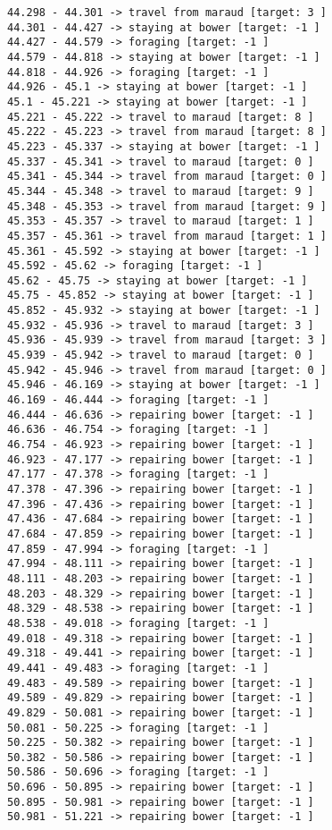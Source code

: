 \documentclass[11pt]{article}
\begin{document}
\begin{Verbatim}[commandchars=\\\{\}]
44.298 - 44.301 -> travel from maraud [target: 3 ]
44.301 - 44.427 -> staying at bower [target: -1 ]
44.427 - 44.579 -> foraging [target: -1 ]
44.579 - 44.818 -> staying at bower [target: -1 ]
44.818 - 44.926 -> foraging [target: -1 ]
44.926 - 45.1 -> staying at bower [target: -1 ]
45.1 - 45.221 -> staying at bower [target: -1 ]
45.221 - 45.222 -> travel to maraud [target: 8 ]
45.222 - 45.223 -> travel from maraud [target: 8 ]
45.223 - 45.337 -> staying at bower [target: -1 ]
45.337 - 45.341 -> travel to maraud [target: 0 ]
45.341 - 45.344 -> travel from maraud [target: 0 ]
45.344 - 45.348 -> travel to maraud [target: 9 ]
45.348 - 45.353 -> travel from maraud [target: 9 ]
45.353 - 45.357 -> travel to maraud [target: 1 ]
45.357 - 45.361 -> travel from maraud [target: 1 ]
45.361 - 45.592 -> staying at bower [target: -1 ]
45.592 - 45.62 -> foraging [target: -1 ]
45.62 - 45.75 -> staying at bower [target: -1 ]
45.75 - 45.852 -> staying at bower [target: -1 ]
45.852 - 45.932 -> staying at bower [target: -1 ]
45.932 - 45.936 -> travel to maraud [target: 3 ]
45.936 - 45.939 -> travel from maraud [target: 3 ]
45.939 - 45.942 -> travel to maraud [target: 0 ]
45.942 - 45.946 -> travel from maraud [target: 0 ]
45.946 - 46.169 -> staying at bower [target: -1 ]
46.169 - 46.444 -> foraging [target: -1 ]
46.444 - 46.636 -> repairing bower [target: -1 ]
46.636 - 46.754 -> foraging [target: -1 ]
46.754 - 46.923 -> repairing bower [target: -1 ]
46.923 - 47.177 -> repairing bower [target: -1 ]
47.177 - 47.378 -> foraging [target: -1 ]
47.378 - 47.396 -> repairing bower [target: -1 ]
47.396 - 47.436 -> repairing bower [target: -1 ]
47.436 - 47.684 -> repairing bower [target: -1 ]
47.684 - 47.859 -> repairing bower [target: -1 ]
47.859 - 47.994 -> foraging [target: -1 ]
47.994 - 48.111 -> repairing bower [target: -1 ]
48.111 - 48.203 -> repairing bower [target: -1 ]
48.203 - 48.329 -> repairing bower [target: -1 ]
48.329 - 48.538 -> repairing bower [target: -1 ]
48.538 - 49.018 -> foraging [target: -1 ]
49.018 - 49.318 -> repairing bower [target: -1 ]
49.318 - 49.441 -> repairing bower [target: -1 ]
49.441 - 49.483 -> foraging [target: -1 ]
49.483 - 49.589 -> repairing bower [target: -1 ]
49.589 - 49.829 -> repairing bower [target: -1 ]
49.829 - 50.081 -> repairing bower [target: -1 ]
50.081 - 50.225 -> foraging [target: -1 ]
50.225 - 50.382 -> repairing bower [target: -1 ]
50.382 - 50.586 -> repairing bower [target: -1 ]
50.586 - 50.696 -> foraging [target: -1 ]
50.696 - 50.895 -> repairing bower [target: -1 ]
50.895 - 50.981 -> repairing bower [target: -1 ]
50.981 - 51.221 -> repairing bower [target: -1 ]

\end{Verbatim}
\end{document}

